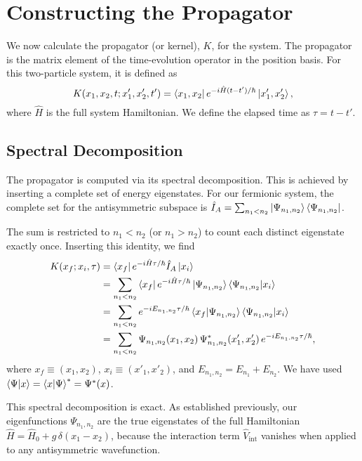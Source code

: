 \section{Constructing the Propagator} \label{sec:propagator}

We now calculate the propagator (or kernel), $K$, for the system.
The propagator is the matrix element of the time-evolution operator
in the position basis. For this two-particle system, it is defined as
\begin{equation}
  K(x_1, x_2, t; x'_1, x'_2, t') =
  \bra{x_1, x_2} e^{-i\hat{H}(t-t')/\hbar} \ket{x'_1, x'_2},
\end{equation}
where $\hat{H}$ is the full system Hamiltonian. We define the
elapsed time as $\tau = t-t'$.

\subsection{Spectral Decomposition}

The propagator is computed via its spectral decomposition. This is
achieved by inserting a complete set of energy eigenstates.
For our fermionic system, the complete set for the antisymmetric
subspace is $\hat{I}_A = \sum_{n_1 < n_2} \ket{\Psi_{n_1, n_2}}
\bra{\Psi_{n_1, n_2}}$.

The sum is restricted to $n_1 < n_2$ (or $n_1 > n_2$) to count each
distinct eigenstate exactly once. Inserting this identity, we find
\begin{align} \label{eq:propagator_spectral_sum}
  K(x_f; x_i, \tau)
    &= \bra{x_f} e^{-i\hat{H}\tau/\hbar} \hat{I}_A \ket{x_i} \nonumber \\
    &= \sum_{n_1 < n_2} \bra{x_f} e^{-i\hat{H}\tau/\hbar}
    \ket{\Psi_{n_1, n_2}} \braket{\Psi_{n_1, n_2} | x_i} \nonumber \\
    &= \sum_{n_1 < n_2} e^{-iE_{n_1, n_2}\tau/\hbar}
    \braket{x_f | \Psi_{n_1, n_2}} \braket{\Psi_{n_1, n_2} | x_i}
    \nonumber \\
    &= \sum_{n_1 < n_2} \Psi_{n_1, n_2}(x_1, x_2) \,
    \Psi_{n_1, n_2}^*(x'_1, x'_2) \, e^{-iE_{n_1, n_2}\tau/\hbar},
\end{align}
where $x_f \equiv (x_1, x_2)$, $x_i \equiv (x'_1, x'_2)$,
and $E_{n_1, n_2} = E_{n_1} + E_{n_2}$.
We have used $\braket{\Psi | x} = \braket{x | \Psi}^* = \Psi^*(x)$.

This spectral decomposition is exact. As established previously,
our eigenfunctions $\Psi_{n_1, n_2}$ are the true eigenstates of
the full Hamiltonian $\hat{H} = \hat{H}_0 + g\,\delta(x_1 - x_2)$,
because the interaction term $\hat{V}_{\text{int}}$ vanishes
when applied to any antisymmetric wavefunction.

